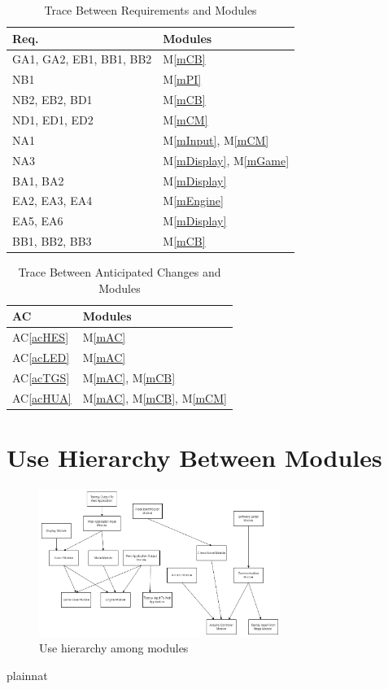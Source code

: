 \documentclass[12pt, titlepage]{article}
\newcommand{\acref}[1]{AC\ref{#1}}
\newcommand{\mref}[1]{M\ref{#1}}
\begin{document}
\begin{table}[H]
\centering
\begin{tabular}{p{} p{}}
\toprule
\textbf{Req.} & \textbf{Modules}\\
\midrule
GA1, GA2, EB1, BB1, BB2 & \mref{mCB}\\
NB1 & \mref{mPI} \\
NB2, EB2, BD1 & \mref{mCB} \\
ND1, ED1, ED2 & \mref{mCM} \\
NA1 & \mref{mInput}, \mref{mCM}\\
NA3 & \mref{mDisplay}, \mref{mGame}\\
BA1, BA2 & \mref{mDisplay} \\
EA2, EA3, EA4 & \mref{mEngine} \\
EA5, EA6 & \mref{mDisplay} \\
BB1, BB2, BB3 & \mref{mCB} \\
\bottomrule
\end{tabular}
\caption{Trace Between Requirements and Modules}
\label{TblRT}
\end{table}

\begin{table}[H]
\centering
\begin{tabular}{p{} p{}}
\toprule
\textbf{AC} & \textbf{Modules}\\
\midrule
\acref{acHES} & \mref{mAC}\\
\acref{acLED} & \mref{mAC}\\
\acref{acTGS} & \mref{mAC}, \mref{mCB}\\
\acref{acHUA} & \mref{mAC}, \mref{mCB}, \mref{mCM}\\
\bottomrule
\end{tabular}
\caption{Trace Between Anticipated Changes and Modules}
\label{TblACT}
\end{table}

\section{Use Hierarchy Between Modules} \label{SecUse}

\begin{figure}[H]
\centering
\includegraphics[width=0.7\textwidth]{ModuleHierarchy.png}
\caption{Use hierarchy among modules}
\label{FigUH}
\end{figure}


 {plainnat}

\end{document}

